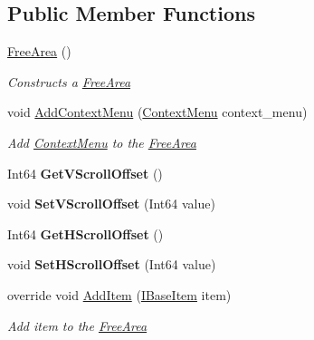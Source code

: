 \subsection*{Public Member Functions}
\begin{DoxyCompactItemize}
\item 
\mbox{\hyperlink{class_space_v_i_l_1_1_free_area_a66c2dcb40e9cacde8f342c20a5193d96}{Free\+Area}} ()
\begin{DoxyCompactList}\small\item\em Constructs a \mbox{\hyperlink{class_space_v_i_l_1_1_free_area}{Free\+Area}} \end{DoxyCompactList}\item 
void \mbox{\hyperlink{class_space_v_i_l_1_1_free_area_af8b1aa9fc2390fb36a34b6bf4d1ef76a}{Add\+Context\+Menu}} (\mbox{\hyperlink{class_space_v_i_l_1_1_context_menu}{Context\+Menu}} context\+\_\+menu)
\begin{DoxyCompactList}\small\item\em Add \mbox{\hyperlink{class_space_v_i_l_1_1_context_menu}{Context\+Menu}} to the \mbox{\hyperlink{class_space_v_i_l_1_1_free_area}{Free\+Area}} \end{DoxyCompactList}\item 
\mbox{\label{class_space_v_i_l_1_1_free_area_a4c8146cf698c74fe8b1d45563bff7deb}} 
Int64 {\bfseries Get\+V\+Scroll\+Offset} ()
\item 
\mbox{\label{class_space_v_i_l_1_1_free_area_a6d100b7db1e39e65dd36948f5d6ac7c5}} 
void {\bfseries Set\+V\+Scroll\+Offset} (Int64 value)
\item 
\mbox{\label{class_space_v_i_l_1_1_free_area_ae54bfdfc27abafeca195855a88068108}} 
Int64 {\bfseries Get\+H\+Scroll\+Offset} ()
\item 
\mbox{\label{class_space_v_i_l_1_1_free_area_a0d5c172e4651d0641fd4c380ab0ba265}} 
void {\bfseries Set\+H\+Scroll\+Offset} (Int64 value)
\item 
override void \mbox{\hyperlink{class_space_v_i_l_1_1_free_area_a9145cbd1711d975fee90fde3187c1aff}{Add\+Item}} (\mbox{\hyperlink{interface_space_v_i_l_1_1_core_1_1_i_base_item}{I\+Base\+Item}} item)
\begin{DoxyCompactList}\small\item\em Add item to the \mbox{\hyperlink{class_space_v_i_l_1_1_free_area}{Free\+Area}} \end{DoxyCompactList}\item 

\end{DoxyCompactItemize}
